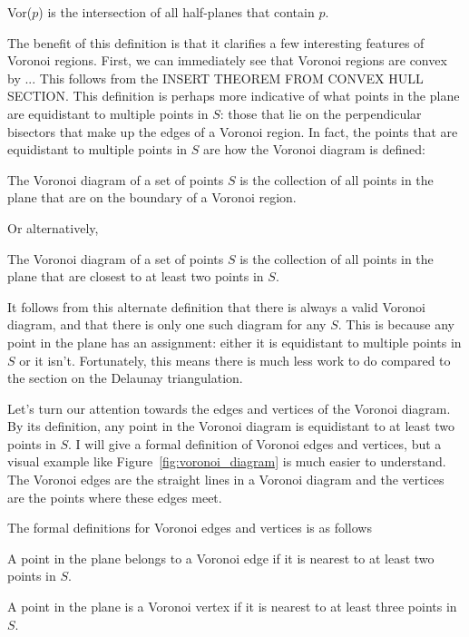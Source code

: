 \begin{definition}
	Vor($p$) is the intersection of all half-planes that contain $p$.
\end{definition}

The benefit of this definition is that it clarifies a few interesting features of Voronoi regions.
First, we can immediately see that Voronoi regions are convex by ...
This follows from the INSERT THEOREM FROM CONVEX HULL SECTION.
This definition is perhaps more indicative of what points in the plane are equidistant to multiple points in $S$: those that lie on the perpendicular bisectors that make up the edges of a Voronoi region.
In fact, the points that are equidistant to multiple points in $S$ are how the Voronoi diagram is defined:

\begin{definition}
	The Voronoi diagram of a set of points $S$ is the collection of all points in the plane that are on the boundary of a Voronoi region.
\end{definition}

Or alternatively,
\begin{definition}
	The Voronoi diagram of a set of points $S$ is the collection of all points in the plane that are closest to at least two points in $S$.
\end{definition}



It follows from this alternate definition that there is always a valid Voronoi diagram, and that there is only one such diagram for any $S$.
This is because any point in the plane has an assignment: either it is equidistant to multiple points in $S$ or it isn't.
Fortunately, this means there is much less work to do compared to the section on the Delaunay triangulation.

Let's turn our attention towards the edges and vertices of the Voronoi diagram.
By its definition, any point in the Voronoi diagram is equidistant to at least two points in $S$.
I will give a formal definition of Voronoi edges and vertices, but a visual example like Figure~\ref{fig:voronoi_diagram} is much easier to understand.
The Voronoi edges are the straight lines in a Voronoi diagram and the vertices are the points where these edges meet.

The formal definitions for Voronoi edges and vertices is as follows
\begin{definition}
	A point in the plane belongs to a Voronoi edge if it is nearest to at least two points in $S$.

	A point in the plane is a Voronoi vertex if it is nearest to at least three points in $S$.
\end{definition}

